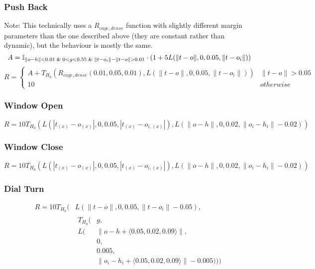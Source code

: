 {\subsubsection{Push Back}
Note: This technically uses a $R_{cage,dense}$ function with slightly different margin parameters than the one described above (they are constant rather than dynamic), but the behaviour is mostly the same.
\[
A=\mathbb{I}_{\lVert o - h \rVert < 0.01 \And 0 < g < 0.55 \And \lVert t - o_i \rVert - \lVert t - o \rVert > 0.01} \cdot
    (1 + 5L(\lVert t - o \rVert, 0, 0.05, \lVert t - o_i \rVert))
\]
\[
R=\left\{
    \begin{array}{ll}
        A + 
        T_{H_0}\left(
            R_{cage,dense}(0.01,0.05,0.01),
            L(\lVert t - o \rVert, 0, 0.05, \lVert t - o_i \rVert)
        \right)
            & \lVert t - o \rVert > 0.05 \\
        10
            & otherwise
    \end{array}
\right.
\]

\subsubsection{Window Open}
\[
R=10T_{H_0}(
    L(| t_{(x)} - o_{(x)} |, 0, 0.05, | t_{(x)} - o_{i,(x)} |),
    L(\lVert o - h \rVert, 0, 0.02, \lVert o_i - h_i \rVert - 0.02)
)
\]

\subsubsection{Window Close}
\[
R=10T_{H_0}(
    L(| t_{(x)} - o_{(x)} |, 0, 0.05, | t_{(x)} - o_{i,(x)} |),
    L(\lVert o - h \rVert, 0, 0.02, \lVert o_i - h_i \rVert - 0.02)
)
\]

\subsubsection{Dial Turn}
\[
\begin{aligned}
R=10T_{H_0}(
    & L(\lVert t - o \rVert, 0, 0.05, \lVert t - o_i \rVert - 0.05) , \\
    & \begin{aligned}
        T_{H_0}(& g, \\
        L(&\lVert o - h + \langle0.05,0.02,0.09\rangle \rVert , \\ 
        & 0, \\
        &0.005, \\
        &\lVert o_i - h_i + \langle0.05,0.02,0.09\rangle \rVert - 0.005)))
    \end{aligned}
\end{aligned}
\]

}
